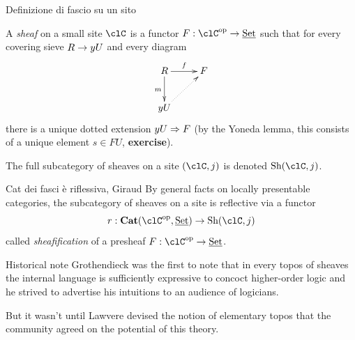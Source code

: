 \documentclass[presentation]{beamer}
\begin{document}
\begin{frame}[label={sec:org9262f53}]{Definizione di fascio su un sito}
	\begin{block}{}
		A \emph{sheaf} on a small site $\clC$ is a functor $F : \clC^\op\to\Set$ such that for every covering sieve $R \to y U$ and every diagram
		\[\xymatrix{
				R \ar[r]^f\ar[d]_m & F \\
				\yo U\ar@{.>}[ur]
			}\]
		there is a unique dotted extension $y U \Rightarrow F$ (by the Yoneda lemma, this consists of a unique element $s\in FU$, \textbf{exercise}).

		The full subcategory of sheaves on a site $(\clC,j)$ is denoted $\text{Sh}(\clC,j)$.
	\end{block}
\end{frame}
\begin{frame}[label={sec:org5bf1529}]{Cat dei fasci è riflessiva, Giraud}
	By general facts on locally presentable categories, the subcategory of sheaves on a site is reflective via a functor
	\[
		r : \textbf{Cat}(\clC^\op,\Set) \to \text{Sh}(\clC,j)
	\] called \emph{sheafification} of a presheaf $F : \clC^\op\to \Set$.

	\begin{block}{Historical note}
		\vspace{3pt}
		\scriptsize
		Grothendieck was the first to note that in every topos of sheaves the \alert{internal language} is sufficiently expressive to concoct \alert{higher-order logic} and he strived to advertise his intuitions to an audience of logicians.

		But it wasn't until Lawvere devised the notion of \alert{elementary topos} that the community agreed on the potential of this theory.
	\end{block}
\end{frame}
\end{document}
